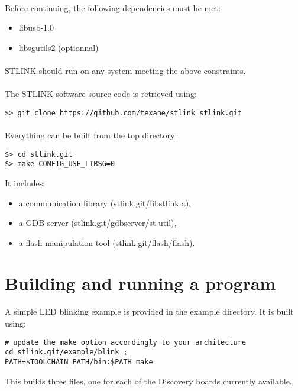 \documentclass[a4paper, 11pt]{article}
\begin{document}
\paragraph{}
Before continuing, the following dependencies must be met:
\begin{itemize}
\item libusb-1.0
\item libsgutils2 (optionnal)
\end{itemize}

\paragraph{}
STLINK should run on any system meeting the above constraints.

\paragraph{}
The STLINK software source code is retrieved using:\\
\begin{small}
\begin{lstlisting}[frame=tb]
$> git clone https://github.com/texane/stlink stlink.git
\end{lstlisting}
\end{small}

\paragraph{}
Everything can be built from the top directory:\\
\begin{small}
\begin{lstlisting}[frame=tb]
$> cd stlink.git
$> make CONFIG_USE_LIBSG=0
\end{lstlisting}
\end{small}
It includes:
\begin{itemize}
\item a communication library (stlink.git/libstlink.a),
\item a GDB server (stlink.git/gdbserver/st-util),
\item a flash manipulation tool (stlink.git/flash/flash).
\end{itemize}


\newpage

\section{Building and running a program}
A simple LED blinking example is provided in the example directory. It is built using:\\
\begin{small}
\begin{lstlisting}[frame=tb]
# update the make option accordingly to your architecture
cd stlink.git/example/blink ;
PATH=$TOOLCHAIN_PATH/bin:$PATH make
\end{lstlisting}
\end{small}
This builds three files, one for each of the Discovery boards currently
available.
\end{document}

